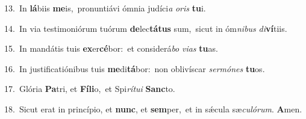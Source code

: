 {\numbfont\textcolor{\numbcolor}{13.}}~In \textbf{lá}\-biis \textbf{me}\-is,~\star pronuntiávi ómnia judíci\textit{a} \textit{o}\-\textit{ris} \textbf{tu}\-i.\par
{\numbfont\textcolor{\numbcolor}{14.}}~In via testimoniórum tuórum \textbf{de}\-lec\-\textbf{tá}\-\textbf{tus} sum,~\star sicut in óm\-\textit{ni}\-\textit{bus} \textit{di}\-\textbf{ví}tiis.\par
{\numbfont\textcolor{\numbcolor}{15.}}~In mandátis tuis \textbf{ex}\-er\-\textbf{cé}\-bor:~\star et considerá\textit{bo} \textit{vi}\-\textit{as} \textbf{tu}\-as.\par
{\numbfont\textcolor{\numbcolor}{16.}}~In justificatiónibus tuis \textbf{me}\-di\-\textbf{tá}\-bor:~\star non oblivíscar \textit{ser}\-\textit{mó}\textit{nes} \textbf{tu}\-os.\par
{\numbfont\textcolor{\numbcolor}{17.}}~Glória \textbf{Pa}\-tri, et \textbf{Fí}\-\textbf{li}o,~\star et Spi\-\textit{rí}\-\textit{tu}\textit{i} \textbf{Sanc}\-to.\par
{\numbfont\textcolor{\numbcolor}{18.}}~Sicut erat in princípio, et \textbf{nunc}\-, et \textbf{sem}\-per,~\star et in sǽcula sæ\-\textit{cu}\-\textit{ló}\textit{rum}. \textbf{A}\-men.\par
